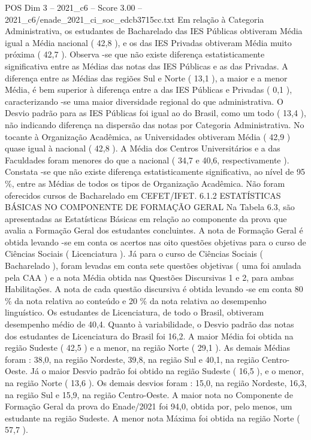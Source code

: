 \begin{textsample}{POS Dim 3 – 2021\_c6 – Score 3.00 – 2021\_c6/enade\_2021\_ci\_soc\_edcb3715cc.txt}
Em relação à Categoria Administrativa, os estudantes de Bacharelado das IES Públicas obtiveram Média igual a Média nacional ( 42,8 ), e os das IES Privadas obtiveram Média muito próxima ( 42,7 ).
Observa -se que não existe diferença estatisticamente significativa entre as Médias das notas das IES Públicas e as das Privadas.
A diferença entre as Médias das regiões Sul e Norte ( 13,1 ), a maior e a menor Média, é bem superior à diferença entre a das IES Públicas e Privadas ( 0,1 ), caracterizando -se uma maior diversidade regional do que administrativa.
O Desvio padrão para as IES Públicas foi igual ao do Brasil, como um todo ( 13,4 ), não indicando diferença na dispersão das notas por Categoria Administrativa.
No tocante à Organização Acadêmica, as Universidades obtiveram Média ( 42,9 ) quase igual à nacional ( 42,8 ).
A Média dos Centros Universitários e a das Faculdades foram menores do que a nacional ( 34,7 e 40,6, respectivamente ).
Constata -se que não existe diferença estatisticamente significativa, ao nível de 95 \%, entre as Médias de todos os tipos de Organização Acadêmica.
Não foram oferecidos cursos de Bacharelado em CEFET/IFET. 6.1.2 ESTATÍSTICAS BÁSICAS NO COMPONENTE DE FORMAÇÃO GERAL Na Tabela 6.3, são apresentadas as Estatísticas Básicas em relação ao componente da prova que avalia a Formação Geral dos estudantes concluintes.
A nota de Formação Geral é obtida levando -se em conta os acertos nas oito questões objetivas para o curso de Ciências Sociais ( Licenciatura ).
Já para o curso de Ciências Sociais ( Bacharelado ), foram levadas em conta sete questões objetivas ( uma foi anulada pela CAA ) e a nota Média obtida nas Questões Discursivas 1 e 2, para ambas Habilitações.
A nota de cada questão discursiva é obtida levando -se em conta 80 \% da nota relativa ao conteúdo e 20 \% da nota relativa ao desempenho linguístico.
Os estudantes de Licenciatura, de todo o Brasil, obtiveram desempenho médio de 40,4.
Quanto à variabilidade, o Desvio padrão das notas dos estudantes de Licenciatura do Brasil foi 16,2.
A maior Média foi obtida na região Sudeste ( 42,5 ) e a menor, na região Norte ( 29,1 ).
As demais Médias foram : 38,0, na região Nordeste, 39,8, na região Sul e 40,1, na região Centro-Oeste.
Já o maior Desvio padrão foi obtido na região Sudeste ( 16,5 ), e o menor, na região Norte ( 13,6 ).
Os demais desvios foram : 15,0, na região Nordeste, 16,3, na região Sul e 15,9, na região Centro-Oeste.
A maior nota no Componente de Formação Geral da prova do Enade/2021 foi 94,0, obtida por, pelo menos, um estudante na região Sudeste.
A menor nota Máxima foi obtida na região Norte ( 57,7 ).

\end{textsample}
